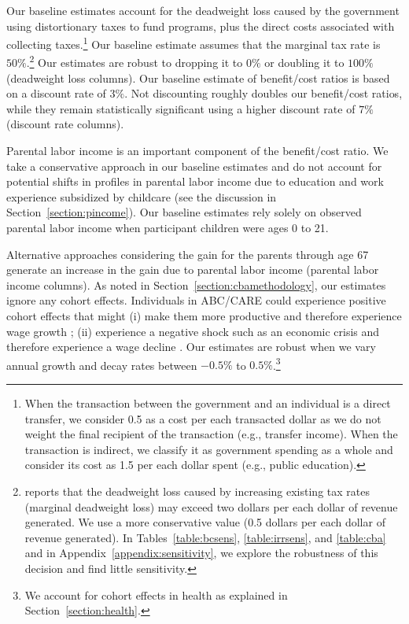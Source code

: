 Our baseline estimates account for the deadweight loss caused by the government using distortionary taxes to fund programs, plus the direct costs associated with collecting taxes.\footnote{When the transaction between the government and an individual is a direct transfer, we consider 0.5 as a cost per each transacted dollar as we do not weight the final recipient of the transaction (e.g., transfer income). When the transaction is indirect, we classify it as government spending as a whole and consider its cost as 1.5 per each dollar spent (e.g., public education).} Our baseline estimate assumes that the marginal tax rate is $50\%$.\footnote{\citet{Feldstein_1999_REStat} reports that the deadweight loss caused by increasing existing tax rates (marginal deadweight loss) may exceed two dollars per each dollar of revenue generated. We use a more conservative value (0.5 dollars per each dollar of revenue generated). In Tables~\ref{table:bcsens}, \ref{table:irrsens}, and \ref{table:cba} and in  Appendix~\ref{appendix:sensitivity}, we explore the robustness of this decision and find little sensitivity.} Our estimates are robust to dropping it to $0\%$ or doubling it to $100\%$ (deadweight loss columns). Our baseline estimate of benefit/cost ratios is based on a discount rate of $3\%$. Not discounting roughly doubles our benefit/cost ratios, while they remain statistically significant using a higher discount rate of $7\%$ (discount rate columns).

Parental labor income is an important component of the benefit/cost ratio. We take a conservative approach in our baseline estimates and do not account for potential shifts in profiles in parental labor income due to education and work experience subsidized by childcare (see the discussion in Section~\ref{section:pincome}). Our baseline estimates rely solely on observed parental labor income when participant children were ages 0 to 21.

Alternative approaches considering the gain for the parents through age 67 generate an increase in the gain due to parental labor income (parental labor income columns). As noted in Section~\ref{section:cbamethodology}, our estimates ignore any cohort effects. Individuals in ABC/CARE could experience positive cohort effects that might (i) make them more productive and therefore experience wage growth \citep{Lagakos_Moll_etal_2016_LifeCycle_NBER}; (ii) experience a negative shock such as an economic crisis and therefore experience a wage decline \citep{Jarosch_2016_JobSecurity_Econometrica}. Our estimates are robust when we vary annual growth and decay rates between $-0.5\%$ to $0.5\%$.\footnote{We account for cohort effects in health as explained in Section~\ref{section:health}.}

